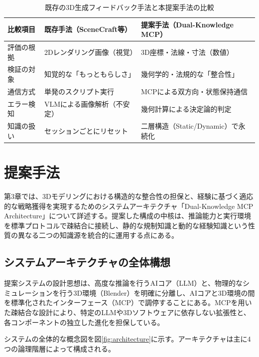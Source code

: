 \documentclass[dvipdfmx, a4paper, 9pt]{deimj}
\begin{document}
\begin{table}[ht]
  \caption{既存の3D生成フィードバック手法と本提案手法の比較}
  \label{tab:comparison}
  \centering
  \small
  \begin{tabular}{lp{3.5cm}p{3.5cm}}
    \toprule
    比較項目 & 既存手法（SceneCraft等） & 提案手法（Dual-Knowledge MCP） \\
    \midrule
    評価の根拠 & 2Dレンダリング画像（視覚） & 3D座標・法線・寸法（数値） \\
    検証の対象 & 知覚的な「もっともらしさ」 & 幾何学的・法規的な「整合性」  \\
    通信方式 & 単発のスクリプト実行 & MCPによる双方向・状態保持通信 \\
    エラー検知 & VLMによる画像解析（不安定） & 幾何計算による決定論的判定 \\
    知識の扱い & セッションごとにリセット & 二層構造（Static/Dynamic）で永続化 \\
    \bottomrule
  \end{tabular}
\end{table}

\section{提案手法}

第3章では、3Dモデリングにおける構造的な整合性の担保と、経験に基づく適応的な戦略獲得を実現するためのシステムアーキテクチャ「Dual-Knowledge MCP Architecture」について詳述する。提案した構成の中核は、推論能力と実行環境を標準プロトコルで疎結合に接続し、静的な規制知識と動的な経験知識という性質の異なる二つの知識源を統合的に運用する点にある。

\subsection{システムアーキテクチャの全体構想}

提案システムの設計思想は、高度な推論を行うAIコア（LLM）と、物理的なシミュレーションを行う3D環境（Blender\cite{community2018blender}）を明確に分離し、AIコアと3D環境の間を標準化されたインターフェース（MCP）で調停することにある。MCPを用いた疎結合な設計により、特定のLLMや3Dソフトウェアに依存しない拡張性と、各コンポーネントの独立した進化を担保している。

システムの全体的な概念図を図\ref{fig:architecture}に示す。アーキテクチャは主に4つの論理階層によって構成される。
\end{document}
